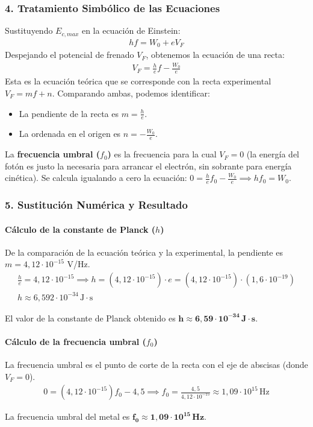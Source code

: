 \subsubsection*{4. Tratamiento Simbólico de las Ecuaciones}
Sustituyendo $E_{c,max}$ en la ecuación de Einstein:
\begin{gather}
    hf = W_0 + eV_F
\end{gather}
Despejando el potencial de frenado $V_F$, obtenemos la ecuación de una recta:
\begin{gather}
    V_F = \frac{h}{e}f - \frac{W_0}{e}
\end{gather}
Esta es la ecuación teórica que se corresponde con la recta experimental $V_F = m f + n$.
Comparando ambas, podemos identificar:
\begin{itemize}
    \item La pendiente de la recta es $m = \frac{h}{e}$.
    \item La ordenada en el origen es $n = -\frac{W_0}{e}$.
\end{itemize}
La \textbf{frecuencia umbral ($f_0$)} es la frecuencia para la cual $V_F=0$ (la energía del fotón es justo la necesaria para arrancar el electrón, sin sobrante para energía cinética). Se calcula igualando a cero la ecuación: $0 = \frac{h}{e}f_0 - \frac{W_0}{e} \implies hf_0 = W_0$.

\subsubsection*{5. Sustitución Numérica y Resultado}
\paragraph*{Cálculo de la constante de Planck ($h$)}
De la comparación de la ecuación teórica y la experimental, la pendiente es $m = 4,12\cdot10^{-15}$ V/Hz.
\begin{gather}
    \frac{h}{e} = 4,12\cdot10^{-15} \implies h = (4,12\cdot10^{-15}) \cdot e = (4,12\cdot10^{-15}) \cdot (1,6\cdot10^{-19}) \nonumber \\[8pt]
    h \approx 6,592 \cdot 10^{-34} \, \text{J}\cdot\text{s}
\end{gather}
\begin{cajaresultado}
    El valor de la constante de Planck obtenido es $\boldsymbol{h \approx 6,59 \cdot 10^{-34} \, J \cdot s}$.
\end{cajaresultado}

\paragraph*{Cálculo de la frecuencia umbral ($f_0$)}
La frecuencia umbral es el punto de corte de la recta con el eje de abscisas (donde $V_F=0$).
\begin{gather}
    0 = (4,12\cdot10^{-15})f_0 - 4,5 \implies f_0 = \frac{4,5}{4,12\cdot10^{-15}} \approx 1,09 \cdot 10^{15} \, \text{Hz}
\end{gather}
\begin{cajaresultado}
    La frecuencia umbral del metal es $\boldsymbol{f_0 \approx 1,09 \cdot 10^{15} \, Hz}$.
\end{cajaresultado}

